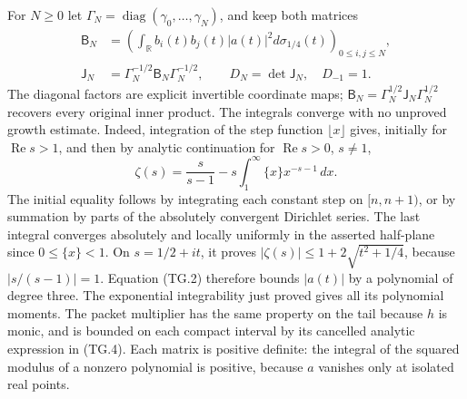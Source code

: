 For \(N\geq0\) let \(\mathsf\Gamma_N=\operatorname{diag}
(\gamma_0,\ldots,\gamma_N)\), and keep both matrices
\[
 \begin{aligned}
 \mathsf B_N&=\left(\int_{\mathbb R}
              b_i(t)b_j(t)|a(t)|^2d\sigma_{1/4}(t)\right)_{0\leq i,j\leq N},\\
 \mathsf J_N&=\mathsf\Gamma_N^{-1/2}\mathsf B_N
                       \mathsf\Gamma_N^{-1/2},\qquad
 D_N=\det\mathsf J_N,\quad D_{-1}=1.
 \end{aligned}                                                    \tag{TG.15}
\]
The diagonal factors are explicit invertible coordinate maps;
\(\mathsf B_N=\mathsf\Gamma_N^{1/2}\mathsf J_N
\mathsf\Gamma_N^{1/2}\) recovers every original inner product.
The integrals converge with no unproved growth estimate.  Indeed,
integration of the step function \(\lfloor x\rfloor\) gives,
initially for \(\operatorname{Re}s>1\), and then by analytic
continuation for \(\operatorname{Re}s>0\), \(s\ne1\),
\[
 \zeta(s)=\frac{s}{s-1}
         -s\int_1^\infty\{x\}x^{-s-1}\,dx.
\]
The initial equality follows by integrating each constant step on
\([n,n+1)\), or by summation by parts of the absolutely convergent
Dirichlet series.  The last integral converges absolutely and
locally uniformly in the asserted half-plane since \(0\leq\{x\}<1\).
On \(s=1/2+it\), it proves
\( |\zeta(s)|\leq1+2\sqrt{t^2+1/4}\), because
\(|s/(s-1)|=1\).  Equation (TG.2) therefore bounds \(|a(t)|\)
by a polynomial of degree three.  The exponential integrability
just proved gives all its polynomial moments.  The packet
multiplier has the same property on the tail because \(h\) is
monic, and is bounded on each compact interval by its cancelled
analytic expression in (TG.4).
Each matrix is positive definite:
the integral of the squared modulus of a nonzero polynomial is
positive, because \(a\) vanishes only at isolated real points.

